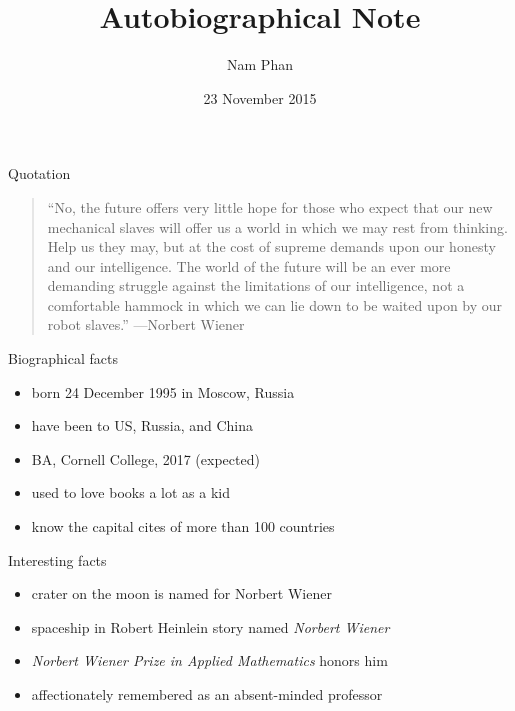 \documentclass{beamer}
\title{Autobiographical Note}
\author{Nam Phan}
\institute{Cornell College}
\date{23 November 2015}
\begin{document}
\begin{frame}
  \titlepage
\end{frame}

\begin{frame}{Quotation}
\begin{quotation}
\noindent
``No, the future offers very little hope for those who expect that our
  new mechanical slaves will offer us a world in which we may rest
  from thinking. Help us they may, but at the cost of supreme demands
  upon our honesty and our intelligence.  The world of the future will
  be an ever more demanding struggle against the limitations of our
  intelligence, not a comfortable hammock in which we can lie down to
  be waited upon by our robot slaves.''
  \flushright
  ---Norbert Wiener
  \end{quotation}
\end{frame}

\begin{frame}{Biographical facts}
\begin{itemize}
  \item born 24 December 1995 in Moscow, Russia
  \item have been to US, Russia, and China
  \item BA, Cornell College, 2017 (expected)
  \item used to love books a lot as a kid
  \item know the capital cites of more than 100 countries
  \end{itemize}
\end{frame}

\begin{frame}{Interesting facts}
\begin{itemize}
  \item crater on the moon is named for Norbert Wiener
  \item spaceship in Robert Heinlein story
    named \emph{Norbert Wiener}
  \item \emph{Norbert Wiener Prize in Applied Mathematics} honors him
  \item affectionately remembered as an absent-minded professor
  \end{itemize}
\end{frame}
\end{document}
